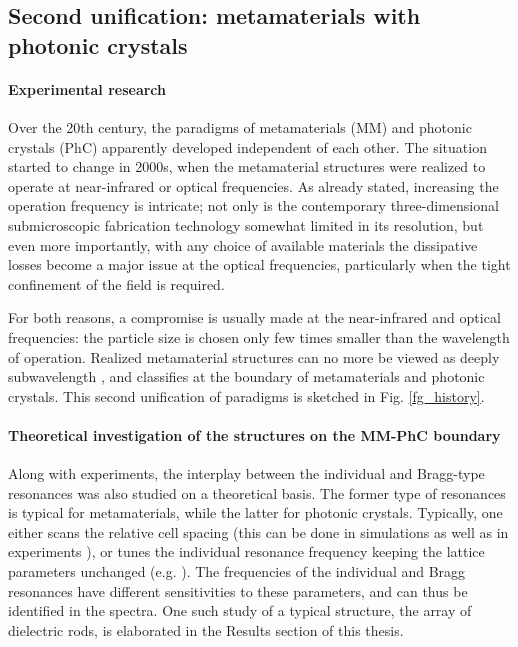 
\subsection{Second unification: metamaterials with photonic crystals} 
\paragraph{Experimental research}%
Over the 20th century, the paradigms of metamaterials (MM) and photonic crystals (PhC) apparently developed independent of each other. The situation started to change in 2000s, when the metamaterial structures were realized to operate at near-infrared or optical frequencies. As already stated, increasing the operation frequency is intricate; not only is the contemporary three-dimensional submicroscopic fabrication technology somewhat limited in its resolution, but even more importantly, with any choice of available materials the dissipative losses become a major issue at the optical frequencies, particularly when the tight confinement of the field is required. 

For both reasons,  a compromise is usually made at the near-infrared and optical frequencies: the particle size is chosen only few times smaller than the wavelength of operation. 
Realized metamaterial structures can no more be viewed as deeply subwavelength \cite{paul2011reflection}, and classifies at the boundary of metamaterials and photonic crystals. This second unification of paradigms is sketched in Fig. \ref{fg_history}. 

\paragraph{Theoretical investigation of the structures on the MM-PhC boundary}%
Along with experiments, the interplay between the individual and Bragg-type resonances was also studied on a theoretical basis. The former type of resonances is typical for metamaterials, while the latter for photonic crystals. Typically, one either scans the relative cell spacing (this can be done in simulations \cite{shi2007, dominec2014transition} as well as in experiments \cite{rybin2015phase}),  %
or tunes the individual resonance frequency keeping the lattice parameters unchanged (e.g. \cite{chakrabarti2012magnetic}). The frequencies of the individual and Bragg resonances have different sensitivities to these parameters, and can thus be identified in the spectra. One such study of a typical structure, the array of dielectric rods, is elaborated in the Results section of this thesis.

